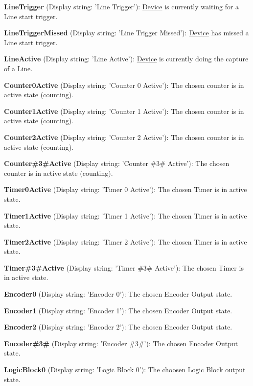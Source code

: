 \begin{DoxyItemize}
\item {\bfseries Line\+Trigger} (Display string\+: 'Line Trigger')\+: \hyperlink{classmv_i_m_p_a_c_t_1_1acquire_1_1_device}{Device} is currently waiting for a Line start trigger.
\item {\bfseries Line\+Trigger\+Missed} (Display string\+: 'Line Trigger Missed')\+: \hyperlink{classmv_i_m_p_a_c_t_1_1acquire_1_1_device}{Device} has missed a Line start trigger.
\item {\bfseries Line\+Active} (Display string\+: 'Line Active')\+: \hyperlink{classmv_i_m_p_a_c_t_1_1acquire_1_1_device}{Device} is currently doing the capture of a Line.
\item {\bfseries Counter0\+Active} (Display string\+: 'Counter 0 Active')\+: The chosen counter is in active state (counting).
\item {\bfseries Counter1\+Active} (Display string\+: 'Counter 1 Active')\+: The chosen counter is in active state (counting).
\item {\bfseries Counter2\+Active} (Display string\+: 'Counter 2 Active')\+: The chosen counter is in active state (counting).
\item {\bfseries Counter\#3\#Active} (Display string\+: 'Counter \#3\# Active')\+: The chosen counter is in active state (counting).
\item {\bfseries Timer0\+Active} (Display string\+: 'Timer 0 Active')\+: The chosen Timer is in active state.
\item {\bfseries Timer1\+Active} (Display string\+: 'Timer 1 Active')\+: The chosen Timer is in active state.
\item {\bfseries Timer2\+Active} (Display string\+: 'Timer 2 Active')\+: The chosen Timer is in active state.
\item {\bfseries Timer\#3\#Active} (Display string\+: 'Timer \#3\# Active')\+: The chosen Timer is in active state.
\item {\bfseries Encoder0} (Display string\+: 'Encoder 0')\+: The chosen Encoder Output state.
\item {\bfseries Encoder1} (Display string\+: 'Encoder 1')\+: The chosen Encoder Output state.
\item {\bfseries Encoder2} (Display string\+: 'Encoder 2')\+: The chosen Encoder Output state.
\item {\bfseries Encoder\#3\#} (Display string\+: 'Encoder \#3\#')\+: The chosen Encoder Output state.
\item {\bfseries Logic\+Block0} (Display string\+: 'Logic Block 0')\+: The choosen Logic Block output state.

\end{DoxyItemize}

